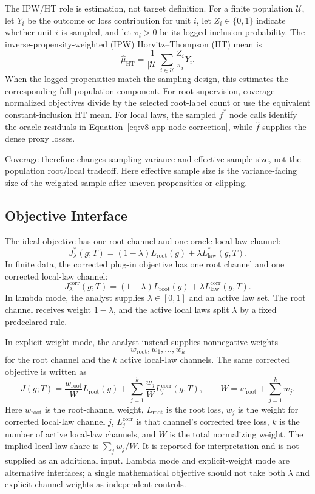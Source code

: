 The IPW/HT role is estimation, not target definition. For a finite population
\(\mathcal U\), let \(Y_i\) be the outcome or loss contribution for unit
\(i\), let \(Z_i\in\{0,1\}\) indicate whether unit \(i\) is sampled, and let
\(\pi_i>0\) be its logged inclusion probability. The
inverse-propensity-weighted (IPW) Horvitz--Thompson (HT) mean is
\[
  \widehat\mu_{\mathrm{HT}}
  =
  \frac{1}{|\mathcal U|}
  \sum_{i\in\mathcal U}\frac{Z_i}{\pi_i}Y_i .
\]
When the logged propensities match the sampling design, this estimates the
corresponding full-population component. For root supervision,
coverage-normalized objectives divide by the selected root-label count or use
the equivalent constant-inclusion HT mean. For local laws, the sampled
\(f^\ast\) node calls identify the oracle residuals in
Equation~\eqref{eq:v8-app-node-correction}, while \(\widehat f\) supplies the
dense proxy losses.

Coverage therefore changes sampling variance and effective sample size, not
the population root/local tradeoff. Here effective sample size is the
variance-facing size of the weighted sample after uneven propensities or
clipping.

\subsection{Objective Interface}
\label{app:v8-objective-interface}

The ideal objective has one root channel and one oracle local-law channel:
\[
  J_\lambda^\ast(g;T)
  =
  (1-\lambda)L_{\mathrm{root}}(g)
  +
  \lambda L_{\mathrm{law}}^\ast(g,T).
\]
In finite data, the corrected plug-in objective has one root channel and one
corrected local-law channel:
\begin{equation}
\label{eq:v8-app-final-objective}
  J_\lambda^{\mathrm{corr}}(g;T)
  =
  (1-\lambda)L_{\mathrm{root}}(g)
  +
  \lambda L_{\mathrm{law}}^{\mathrm{corr}}(g,T).
\end{equation}
In lambda mode, the analyst supplies \(\lambda\in[0,1]\) and an active law
set. The root channel receives weight \(1-\lambda\), and the active local laws
split \(\lambda\) by a fixed predeclared rule.

In explicit-weight mode, the analyst instead supplies nonnegative weights
\[
  w_{\mathrm{root}},w_1,\ldots,w_k
\]
for the root channel and the \(k\) active local-law channels. The same
corrected objective is written as
\[
  J(g;T)
  =
  \frac{w_{\mathrm{root}}}{W}L_{\mathrm{root}}(g)
  +
  \sum_{j=1}^k
  \frac{w_j}{W}L_j^{\mathrm{corr}}(g,T),
  \qquad
  W=w_{\mathrm{root}}+\sum_{j=1}^k w_j .
\]
Here \(w_{\mathrm{root}}\) is the root-channel weight,
\(L_{\mathrm{root}}\) is the root loss, \(w_j\) is the weight for corrected
local-law channel \(j\), \(L_j^{\mathrm{corr}}\) is that channel's corrected
tree loss, \(k\) is the number of active local-law channels, and \(W\) is the
total normalizing weight. The implied local-law share is \(\sum_j w_j/W\). It
is reported for interpretation and is not supplied as an additional input.
Lambda mode and explicit-weight mode are alternative interfaces; a single
mathematical objective should not take both \(\lambda\) and explicit channel
weights as independent controls.

